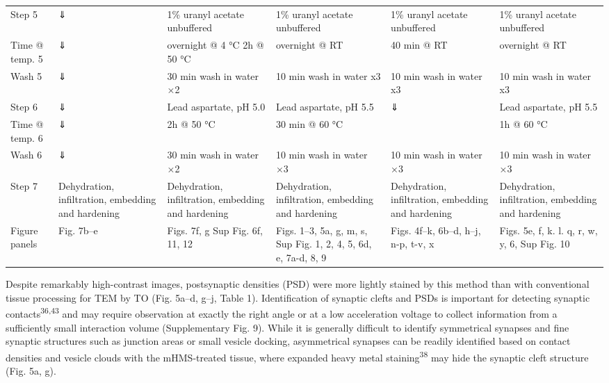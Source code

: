 \documentclass{article}
\begin{document}
\begin{center}
\begin{longtable}{ABBBBB}
Step 5 & ⇓ & 1\% uranyl acetate unbuffered & 1\% uranyl acetate unbuffered & 1\% uranyl acetate unbuffered & 1\% uranyl acetate unbuffered \\
Time @ temp. 5 & ⇓ & overnight @ 4 °C 2h @ 50 °C & overnight @ RT & 40 min @ RT & overnight @ RT \\
Wash 5 & ⇓ & 30 min wash in water ×2 & 10 min wash in water x3 & 10 min wash in water x3 & 10 min wash in water x3 \\
Step 6 & ⇓ & Lead aspartate, pH 5.0 & Lead aspartate, pH 5.5 & ⇓ & Lead aspartate, pH 5.5 \\
Time @ temp. 6 & ⇓ & 2h @ 50 °C & 30 min @ 60 °C &  & 1h @ 60 °C \\
Wash 6 & ⇓ & 30 min wash in water ×2 & 10 min wash in water ×3 & 10 min wash in water ×3 & 10 min wash in water ×3 \\
Step 7 & Dehydration, infiltration, embedding and hardening & Dehydration, infiltration, embedding and hardening & Dehydration, infiltration, embedding and hardening & Dehydration, infiltration, embedding and hardening & Dehydration, infiltration, embedding and hardening \\
Figure panels & Fig. 7b–e & Figs. 7f, g Sup Fig. 6f, 11, 12 & Figs. 1–3, 5a, g, m, s, Sup Fig. 1, 2, 4, 5, 6d, e, 7a-d, 8, 9 & Figs. 4f–k, 6b–d, h–j, n-p, t-v, x & Figs. 5e, f, k. l. q, r, w, y, 6, Sup Fig. 10 \\
\bottomrule
\end{longtable}
\end{center}


Despite remarkably high-contrast images, postsynaptic densities (PSD) were more lightly stained by this method than with conventional tissue processing for TEM by TO (Fig. 5a–d, g–j, Table 1). Identification of synaptic clefts and PSDs is important for detecting synaptic contacts\textsuperscript{36,43} and may require observation at exactly the right angle or at a low acceleration voltage to collect information from a sufficiently small interaction volume (Supplementary Fig. 9). While it is generally difficult to identify symmetrical synapses and fine synaptic structures such as junction areas or small vesicle docking, asymmetrical synapses can be readily identified based on contact densities and vesicle clouds with the mHMS-treated tissue, where expanded heavy metal staining\textsuperscript{38} may hide the synaptic cleft structure (Fig. 5a, g).
\end{document}
